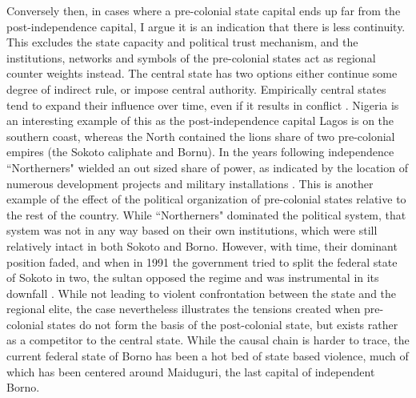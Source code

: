 \documentclass[12pt]{article}
\begin{document}

Conversely then, in cases where a pre-colonial state capital ends up far from
the post-independence capital, I argue it is an indication that there is less
continuity. This excludes the state capacity and political trust mechanism, and
the institutions, networks and symbols of the pre-colonial states act as
regional counter weights instead. The central state has two options either
continue some degree of indirect rule, or impose central authority. Empirically
central states tend to expand their influence over time, even if it results in
conflict \citep{Ying_2020}. Nigeria is an interesting example of this as the
post-independence capital Lagos is on the southern coast, whereas the North
contained the lions share of two pre-colonial empires (the Sokoto caliphate and
Bornu). In the years following independence ``Northerners" wielded an out sized
share of power, as indicated by the location of numerous development projects
and military installations \citep{Bates2008a}. This is another example of the
effect of the political organization of pre-colonial states relative to the rest
of the country. While ``Northerners" dominated the political system, that system
was not in any way based on their own institutions, which were still relatively
intact in both Sokoto and Borno. However, with time, their dominant position
faded, and when in 1991 the government tried to split the federal state of
Sokoto in two, the sultan opposed the regime and was instrumental in its
downfall \citep{HiribarrenVincent2017AHoB}. While not leading to violent
confrontation between the state and the regional elite, the case nevertheless
illustrates the tensions created when pre-colonial states do not form the basis
of the post-colonial state, but exists rather as a competitor to the central
state. While the causal chain is harder to trace, the current federal state of
Borno has been a hot bed of state based violence, much of which has been
centered around Maiduguri, the last capital of independent Borno.
\end{document}
